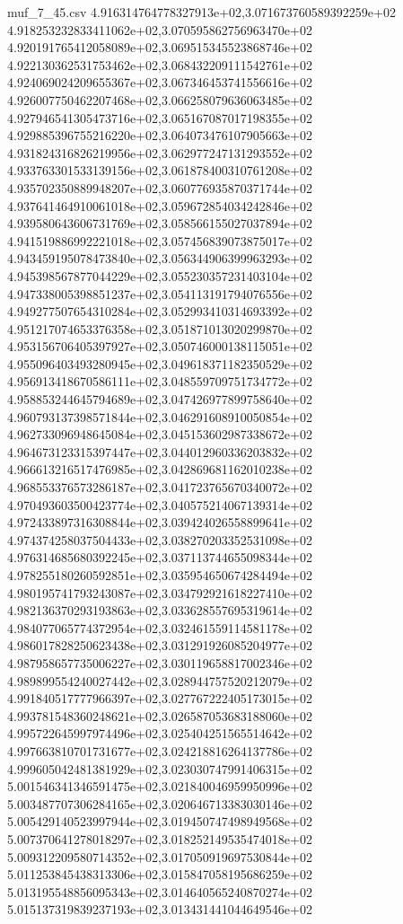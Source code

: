 \begin{filecontents*}{muf_7_45.csv}
4.916314764778327913e+02,3.071673760589392259e+02
4.918253232833411062e+02,3.070595862756963470e+02
4.920191765412058089e+02,3.069515345523868746e+02
4.922130362531753462e+02,3.068432209111542761e+02
4.924069024209655367e+02,3.067346453741556616e+02
4.926007750462207468e+02,3.066258079636063485e+02
4.927946541305473716e+02,3.065167087017198355e+02
4.929885396755216220e+02,3.064073476107905663e+02
4.931824316826219956e+02,3.062977247131293552e+02
4.933763301533139156e+02,3.061878400310761208e+02
4.935702350889948207e+02,3.060776935870371744e+02
4.937641464910061018e+02,3.059672854034242846e+02
4.939580643606731769e+02,3.058566155027037894e+02
4.941519886992221018e+02,3.057456839073875017e+02
4.943459195078473840e+02,3.056344906399963293e+02
4.945398567877044229e+02,3.055230357231403104e+02
4.947338005398851237e+02,3.054113191794076556e+02
4.949277507654310284e+02,3.052993410314693392e+02
4.951217074653376358e+02,3.051871013020299870e+02
4.953156706405397927e+02,3.050746000138115051e+02
4.955096403493280945e+02,3.049618371182350529e+02
4.956913418670586111e+02,3.048559709751734772e+02
4.958853244645794689e+02,3.047426977899758640e+02
4.960793137398571844e+02,3.046291608910050854e+02
4.962733096948645084e+02,3.045153602987338672e+02
4.964673123315397447e+02,3.044012960336203832e+02
4.966613216517476985e+02,3.042869681162010238e+02
4.968553376573286187e+02,3.041723765670340072e+02
4.970493603500423774e+02,3.040575214067139314e+02
4.972433897316308844e+02,3.039424026558899641e+02
4.974374258037504433e+02,3.038270203352531098e+02
4.976314685680392245e+02,3.037113744655098344e+02
4.978255180260592851e+02,3.035954650674284494e+02
4.980195741793243087e+02,3.034792921618227410e+02
4.982136370293193863e+02,3.033628557695319614e+02
4.984077065774372954e+02,3.032461559114581178e+02
4.986017828250623438e+02,3.031291926085204977e+02
4.987958657735006227e+02,3.030119658817002346e+02
4.989899554240027442e+02,3.028944757520212079e+02
4.991840517777966397e+02,3.027767222405173015e+02
4.993781548360248621e+02,3.026587053683188060e+02
4.995722645997974496e+02,3.025404251565514642e+02
4.997663810701731677e+02,3.024218816264137786e+02
4.999605042481381929e+02,3.023030747991406315e+02
5.001546341346591475e+02,3.021840046959950996e+02
5.003487707306284165e+02,3.020646713383030146e+02
5.005429140523997944e+02,3.019450747498949568e+02
5.007370641278018297e+02,3.018252149535474018e+02
5.009312209580714352e+02,3.017050919697530844e+02
5.011253845438313306e+02,3.015847058195686259e+02
5.013195548856095343e+02,3.014640565240870274e+02
5.015137319839237193e+02,3.013431441044649546e+02

\end{filecontents*}
